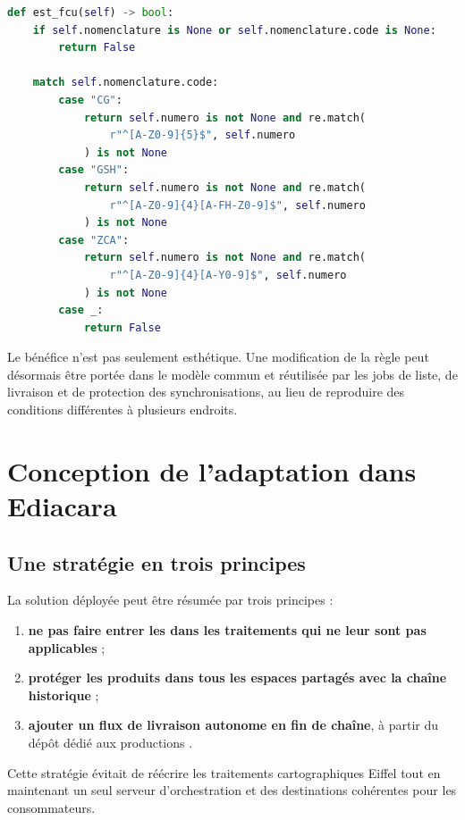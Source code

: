 \begin{lstlisting}[language=Python,caption={Identification centralisée d'une carte \terme{fcu}},label={lst:fcu-est-fcu}]
def est_fcu(self) -> bool:
    if self.nomenclature is None or self.nomenclature.code is None:
        return False

    match self.nomenclature.code:
        case "CG":
            return self.numero is not None and re.match(
                r"^[A-Z0-9]{5}$", self.numero
            ) is not None
        case "GSH":
            return self.numero is not None and re.match(
                r"^[A-Z0-9]{4}[A-FH-Z0-9]$", self.numero
            ) is not None
        case "ZCA":
            return self.numero is not None and re.match(
                r"^[A-Z0-9]{4}[A-Y0-9]$", self.numero
            ) is not None
        case _:
            return False
\end{lstlisting}

Le bénéfice n'est pas seulement esthétique. Une modification de la règle  peut désormais être portée dans le modèle commun et réutilisée par les jobs de liste, de livraison et de protection des synchronisations, au lieu de reproduire des conditions différentes à plusieurs endroits.

\section{Conception de l'adaptation  dans Ediacara}

\subsection{Une stratégie en trois principes}

La solution déployée peut être résumée par trois principes :

\begin{enumerate}
    \item \textbf{ne pas faire entrer les  dans les traitements  qui ne leur sont pas applicables} ;
    \item \textbf{protéger les produits  dans tous les espaces partagés avec la chaîne historique} ;
    \item \textbf{ajouter un flux de livraison  autonome en fin de chaîne}, à partir du dépôt dédié aux productions .
\end{enumerate}

Cette stratégie évitait de réécrire les traitements cartographiques Eiffel tout en maintenant un seul serveur d'orchestration et des destinations cohérentes pour les consommateurs.

